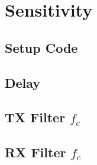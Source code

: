 \documentclass[]{article}
\begin{document}
\section{Sensitivity}
\label{app:sensitivity}
\subsection{Setup Code}


\subsection{Delay}
\label{app:delay}


\subsection{TX Filter $f_c$}
\label{app:freqTX}


\subsection{RX Filter $f_c$}
\label{app:freqRX}

\end{document}
